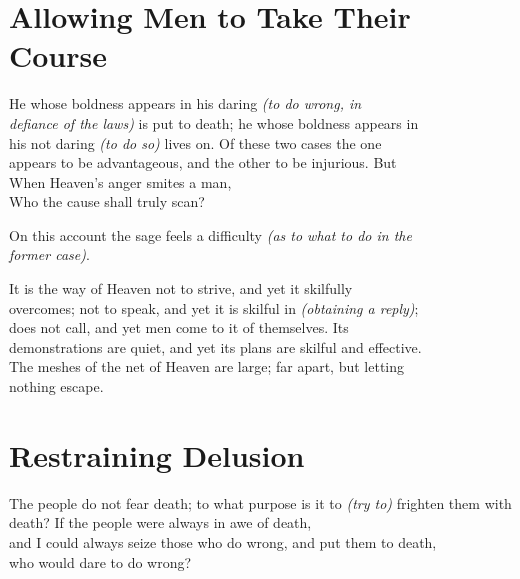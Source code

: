 \section*{Allowing Men to Take Their Course}
    He whose boldness appears in his daring \textit{(to do wrong, in\\
    defiance of the laws)} is put to death; he whose boldness appears in\\
    his not daring \textit{(to do so)} lives on. Of these two cases the one\\
    appears to be advantageous, and the other to be injurious. But\\
    
    When Heaven's anger smites a man,\\
    Who the cause shall truly scan?\vspace{\baselineskip}
    
    On this account the sage feels a difficulty \textit{(as to what to do in the\\
    former case)}.\vspace{\baselineskip}
    
    It is the way of Heaven not to strive, and yet it skilfully\\
    overcomes; not to speak, and yet it is skilful in \textit{(obtaining a reply)};\\
    does not call, and yet men come to it of themselves. Its\\
    demonstrations are quiet, and yet its plans are skilful and effective.\\
    The meshes of the net of Heaven are large; far apart, but letting\\
    nothing escape.\vspace{\baselineskip}

\section*{Restraining Delusion}
    The people do not fear death; to what purpose is it to \textit{(try to)}
    frighten them with death? If the people were always in awe of death,\\
    and I could always seize those who do wrong, and put them to death,\\
    who would dare to do wrong?\vspace{\baselineskip}
    
